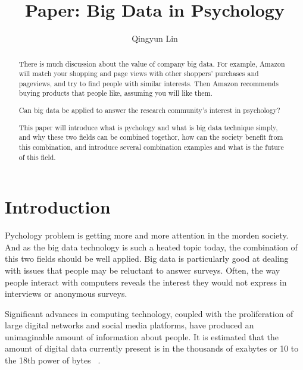 
\title{Paper: Big Data in Psychology}


\author{Qingyun Lin}


\renewcommand{\shortauthors}{G. v. Laszewski}


\begin{abstract}
There is much discussion about the value of company big data. 
For example, Amazon will match your shopping and page views with 
other shoppers’ purchases and pageviews, and try to find people with 
similar interests. Then Amazon recommends buying products that people 
like, assuming you will like them.

Can big data be applied to answer the research community’s interest 
in psychology?

This paper will introduce what is pychology and what is big data 
technique simply, and why these two fields can be combined togethor, 
how can the society benefit from this combination, and introduce 
several combination examples and what is the future of this field.
\end{abstract}



\maketitle

\section{Introduction}

Pychology problem is getting more and more attention in the morden
society. And as the big data technology is such a heated topic 
today, the combination of this two fields should be well applied.
Big data is particularly good at dealing with issues that people 
may be reluctant to answer surveys. Often, the way people interact
 with computers reveals the interest they would not express in 
interviews or anonymous surveys.

Significant advances in computing technology, coupled with the 
proliferation of large digital networks and social media platforms,
 have produced an unimaginable amount of information about people.
It is estimated that the amount of digital data currently present 
is in the thousands of exabytes or 10 to the 18th power of bytes
~\cite{editor00}.

